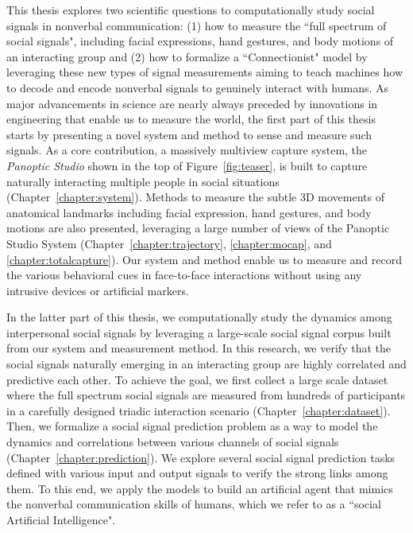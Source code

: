 This thesis explores two scientific questions to computationally study social signals in nonverbal communication: (1) how to measure the ``full spectrum of social signals", including facial expressions, hand gestures, and body motions of an interacting group and (2) how to formalize a ``Connectionist" model by leveraging these new types of signal measurements aiming to teach machines how to decode and encode nonverbal signals to genuinely interact with humans. As major advancements in science are nearly always preceded by innovations in engineering that enable us to measure the world, the first part of this thesis starts by presenting a novel system and method to sense and measure such signals. As a core contribution, a massively multiview capture system, the \emph{Panoptic Studio} shown in the top of Figure~\ref{fig:teaser}, is built to capture naturally interacting multiple people in social situations (Chapter~\ref{chapter:system}). Methods to measure the subtle 3D movements of anatomical landmarks including facial expression, hand gestures, and body motions are also presented, leveraging a large number of views of the Panoptic Studio System (Chapter~\ref{chapter:trajectory}, \ref{chapter:mocap}, and  \ref{chapter:totalcapture}). Our system and method enable us to measure and record the various behavioral cues in face-to-face interactions without using any intrusive devices or artificial markers. 


In the latter part of this thesis, we computationally study the dynamics among interpersonal social signals by leveraging a large-scale social signal corpus built from our system and measurement method. In this research, we verify that the social signals naturally emerging in an interacting group are highly correlated and predictive each other. To achieve the goal, we first collect a large scale dataset where the full spectrum social signals are measured from hundreds of participants in a carefully designed triadic interaction scenario (Chapter~\ref{chapter:dataset}). Then, we formalize a social signal prediction problem as a way to model the dynamics and correlations between various channels of social signals (Chapter~\ref{chapter:prediction}). We explore several social signal prediction tasks defined with various input and output signals to verify the strong links among them. To this end, we apply the models to build an artificial agent that mimics the nonverbal communication skills of humans, which we refer to as a ``social Artificial Intelligence".

